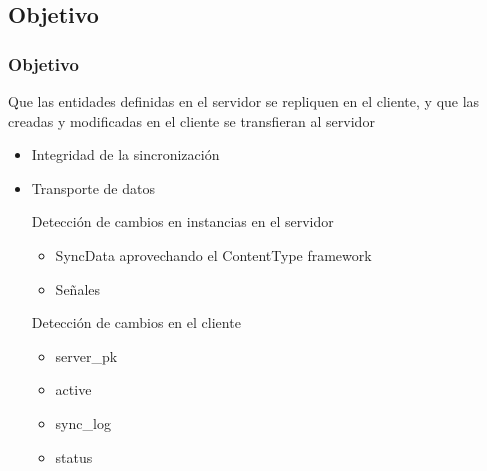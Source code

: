 \documentclass{beamer}
\begin{document}
\subsection{Objetivo}
\begin{frame}
    \frametitle{Objetivo}
    \par {
    	Que las entidades definidas en el servidor se repliquen en el cliente, y
    	que las creadas y modificadas en el cliente se transfieran al servidor
    }
    \pause
    \begin{itemize}
        \item{Integridad de la sincronización}
		\item{Transporte de datos}
		\begin{item}
          \par{Detección de cambios en instancias en el servidor}
		  \begin{itemize}
            \item{SyncData aprovechando el ContentType framework}
            \item{Señales}
          \end{itemize}
		\end{item}
        \begin{item}
          \par{Detección de cambios en el cliente}
          \begin{itemize}
                \item{server\_pk}
                \item{active}
                \item{sync\_log}
                \item{status}
          \end{itemize}
        \end{item}
    \end{itemize}
\end{frame}
\end{document}
